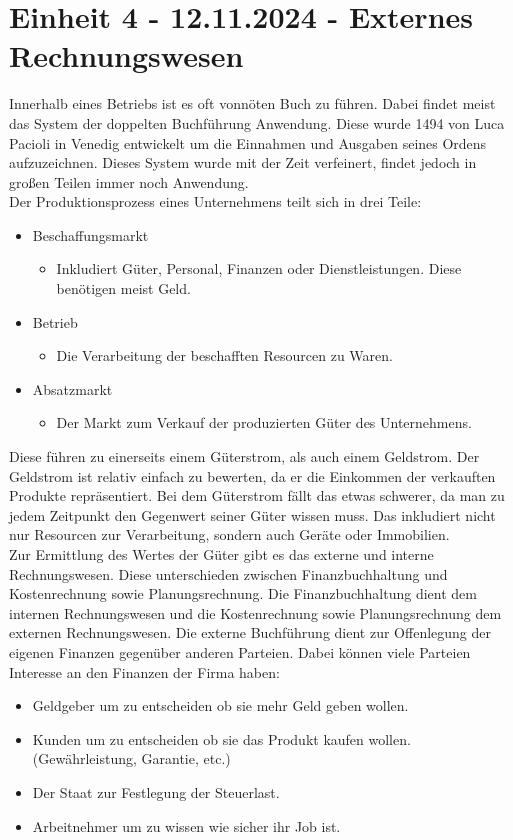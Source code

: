 \documentclass{article}
\begin{document}
	\section{Einheit 4 - 12.11.2024 - Externes Rechnungswesen}
	Innerhalb eines Betriebs ist es oft vonnöten Buch zu führen. Dabei findet meist das System der doppelten Buchführung Anwendung. Diese wurde 1494 von Luca Pacioli in Venedig entwickelt um die Einnahmen und Ausgaben seines Ordens aufzuzeichnen. Dieses System wurde mit der Zeit verfeinert, findet jedoch in großen Teilen immer noch Anwendung. \\
	Der Produktionsprozess eines Unternehmens teilt sich in drei Teile:
	\begin{itemize}
		\item{Beschaffungsmarkt}
		\begin{itemize}
			\item{Inkludiert Güter, Personal, Finanzen oder Dienstleistungen. Diese benötigen meist Geld.}
		\end{itemize}
		\item{Betrieb}
		\begin{itemize}
			\item{Die Verarbeitung der beschafften Resourcen zu Waren.}
		\end{itemize}
		\item{Absatzmarkt}
		\begin{itemize}
			\item{Der Markt zum Verkauf der produzierten Güter des Unternehmens.}
		\end{itemize}
	\end{itemize}
	Diese führen zu einerseits einem Güterstrom, als auch einem Geldstrom. Der Geldstrom ist relativ einfach zu bewerten, da er die Einkommen der verkauften Produkte repräsentiert. Bei dem Güterstrom fällt das etwas schwerer, da man zu jedem Zeitpunkt den Gegenwert seiner Güter wissen muss. Das inkludiert nicht nur Resourcen zur Verarbeitung, sondern auch Geräte oder Immobilien. \\
	Zur Ermittlung des Wertes der Güter gibt es das externe und interne Rechnungswesen. Diese unterschieden zwischen Finanzbuchhaltung und Kostenrechnung sowie Planungsrechnung.
	Die Finanzbuchhaltung dient dem internen Rechnungswesen und die Kostenrechnung sowie Planungsrechnung dem externen Rechnungswesen.
	Die externe Buchführung dient zur Offenlegung der eigenen Finanzen gegenüber anderen Parteien. Dabei können viele Parteien Interesse an den Finanzen der Firma haben:
	\begin{itemize}
		\item{Geldgeber um zu entscheiden ob sie mehr Geld geben wollen.}
		\item{Kunden um zu entscheiden ob sie das Produkt kaufen wollen. (Gewährleistung, Garantie, etc.)}
		\item{Der Staat zur Festlegung der Steuerlast.}
		\item{Arbeitnehmer um zu wissen wie sicher ihr Job ist.}
	\end{itemize}
\end{document}
